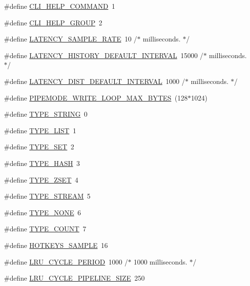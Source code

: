 \begin{DoxyCompactItemize}
\item 
\#define \hyperlink{redis-cli_8c_ad5a18b7d635c6438f512f3c5d7f9f546}{C\+L\+I\+\_\+\+H\+E\+L\+P\+\_\+\+C\+O\+M\+M\+A\+ND}~1
\item 
\#define \hyperlink{redis-cli_8c_a3cac9e62f8d124c91f892f2236135589}{C\+L\+I\+\_\+\+H\+E\+L\+P\+\_\+\+G\+R\+O\+UP}~2
\item 
\#define \hyperlink{redis-cli_8c_a76987a88882cfc750afde2c219a0bbab}{L\+A\+T\+E\+N\+C\+Y\+\_\+\+S\+A\+M\+P\+L\+E\+\_\+\+R\+A\+TE}~10 /$\ast$ milliseconds. $\ast$/
\item 
\#define \hyperlink{redis-cli_8c_a372f614f9e206b8f110cab48214252d5}{L\+A\+T\+E\+N\+C\+Y\+\_\+\+H\+I\+S\+T\+O\+R\+Y\+\_\+\+D\+E\+F\+A\+U\+L\+T\+\_\+\+I\+N\+T\+E\+R\+V\+AL}~15000 /$\ast$ milliseconds. $\ast$/
\item 
\#define \hyperlink{redis-cli_8c_a6441de268c4b35721ec39471428d836f}{L\+A\+T\+E\+N\+C\+Y\+\_\+\+D\+I\+S\+T\+\_\+\+D\+E\+F\+A\+U\+L\+T\+\_\+\+I\+N\+T\+E\+R\+V\+AL}~1000 /$\ast$ milliseconds. $\ast$/
\item 
\#define \hyperlink{redis-cli_8c_aaefb577451e0f5fc0ff993bda43044b6}{P\+I\+P\+E\+M\+O\+D\+E\+\_\+\+W\+R\+I\+T\+E\+\_\+\+L\+O\+O\+P\+\_\+\+M\+A\+X\+\_\+\+B\+Y\+T\+ES}~(128$\ast$1024)
\item 
\#define \hyperlink{redis-cli_8c_a4e4e428e3a6a191834e3ff63bd301866}{T\+Y\+P\+E\+\_\+\+S\+T\+R\+I\+NG}~0
\item 
\#define \hyperlink{redis-cli_8c_a12d33da3418cfc67c9076ef7353ca50b}{T\+Y\+P\+E\+\_\+\+L\+I\+ST}~1
\item 
\#define \hyperlink{redis-cli_8c_a216111b323b4b6e3168596e69c72671b}{T\+Y\+P\+E\+\_\+\+S\+ET}~2
\item 
\#define \hyperlink{redis-cli_8c_a2ee0b296ab2dd19e14df6f097d07981e}{T\+Y\+P\+E\+\_\+\+H\+A\+SH}~3
\item 
\#define \hyperlink{redis-cli_8c_a9ffc96cc0a980403dc1df5cea83fb138}{T\+Y\+P\+E\+\_\+\+Z\+S\+ET}~4
\item 
\#define \hyperlink{redis-cli_8c_a78458977895c28f708af92554a64a8ff}{T\+Y\+P\+E\+\_\+\+S\+T\+R\+E\+AM}~5
\item 
\#define \hyperlink{redis-cli_8c_aa47d3c2fa05e95455d76cf052f9cca68}{T\+Y\+P\+E\+\_\+\+N\+O\+NE}~6
\item 
\#define \hyperlink{redis-cli_8c_a5aa140c2c2e64a57331d450a98077834}{T\+Y\+P\+E\+\_\+\+C\+O\+U\+NT}~7
\item 
\#define \hyperlink{redis-cli_8c_a0f10197c353b6fcaf73df928885167ca}{H\+O\+T\+K\+E\+Y\+S\+\_\+\+S\+A\+M\+P\+LE}~16
\item 
\#define \hyperlink{redis-cli_8c_a514ca976fc45286ea7e8d08caf838733}{L\+R\+U\+\_\+\+C\+Y\+C\+L\+E\+\_\+\+P\+E\+R\+I\+OD}~1000 /$\ast$ 1000 milliseconds. $\ast$/
\item 
\#define \hyperlink{redis-cli_8c_ae524234b44cd0249095699ac9f377254}{L\+R\+U\+\_\+\+C\+Y\+C\+L\+E\+\_\+\+P\+I\+P\+E\+L\+I\+N\+E\+\_\+\+S\+I\+ZE}~250
\end{DoxyCompactItemize}
